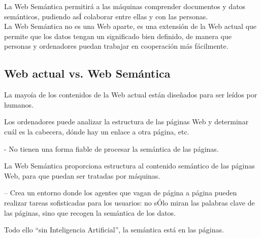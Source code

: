 





La Web Semántica permitirá a las máquinas comprender documentos y datos semánticos, pudiendo asÍ colaborar entre ellas y con las personas.\\

La Web Semántica no es una Web aparte, es una extensión de la Web actual que permite que los datos tengan un significado bien definido, de manera que personas y ordenadores puedan trabajar en cooperación más fácilmente.


\subsection{Web actual vs. Web Semántica}

La mayoía de los contenidos de la Web actual están diseñados para ser leídos por humanos.

Los ordenadores puede analizar la estructura de las páginas Web y determinar cuál es la cabecera, dónde hay un enlace a otra página, etc.

- No tienen una forma fiable de procesar la semántica de las páginas.

La Web Semántica proporciona estructura al contenido semántico de las páginas Web, para que puedan ser tratadas por máquinas.

– Crea un entorno donde los agentes que vagan de página a página pueden realizar tareas sofisticadas para los usuarios: no sÓlo miran las palabras clave de las páginas, sino que recogen la semántica de los datos.

Todo ello “sin Inteligencia Artificial”, la semántica está en las páginas. 

